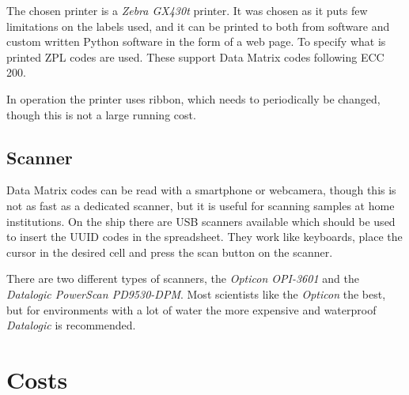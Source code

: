 \documentclass[a4paper,english, 11pt]{article}
\begin{document}
The chosen printer is a \emph{Zebra GX430t} printer. It was chosen as it puts few limitations on the labels used, and it can be printed to both from software and custom written Python software in the form of a web page. To specify what is printed ZPL codes are used. These support Data Matrix codes following ECC 200.


In operation the printer uses ribbon, which needs to periodically be changed, though this is not a large running cost.

\subsection{Scanner} %
\label{sub:Scanner}

Data Matrix codes can be read with a smartphone or webcamera, though this is not as fast as a dedicated scanner, but it is useful for scanning samples at home institutions. On the ship there are USB scanners available which should be used to insert the UUID codes in the spreadsheet. They work like keyboards, place the cursor in the desired cell and press the scan button on the scanner.

There are two different types of scanners, the \emph{Opticon OPI-3601} and the \emph{Datalogic PowerScan PD9530-DPM}. Most scientists like the \emph{Opticon} the best, but for environments with a lot of water the more expensive and waterproof \emph{Datalogic} is recommended.


\section{Costs} %
\label{sec:Costs}
\end{document}
